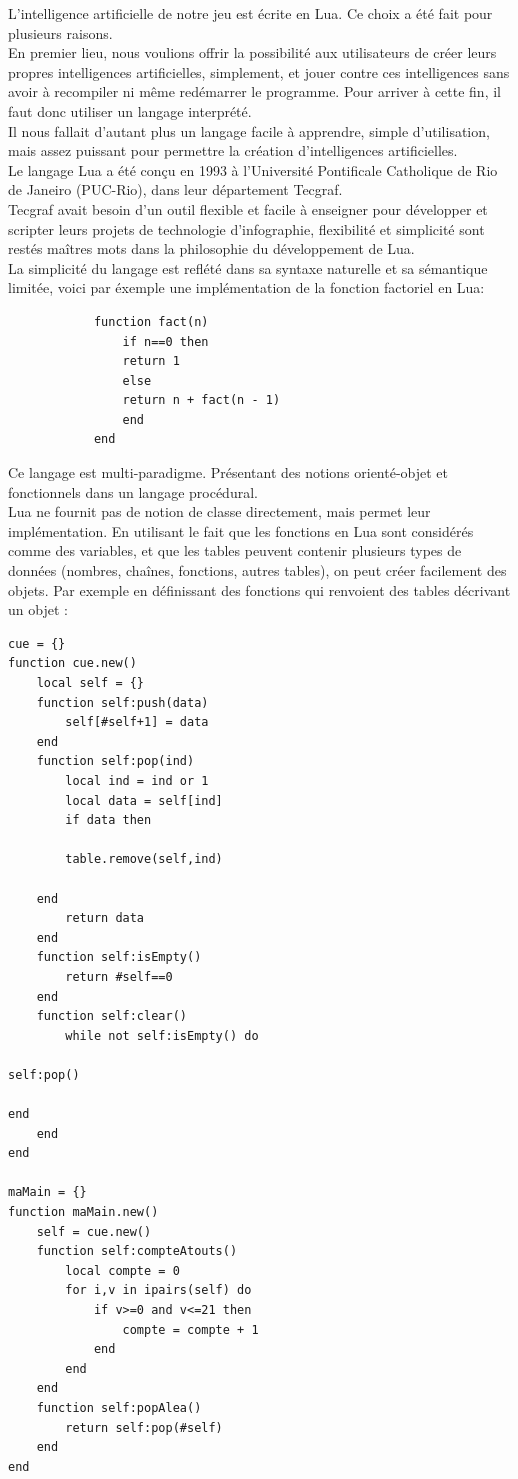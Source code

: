 \documentclass[a4paper]{report}
\begin{document}
		L’intelligence artificielle de notre jeu est écrite en Lua. Ce choix a été fait pour plusieurs raisons.\\
		En premier lieu, nous voulions offrir la possibilité aux utilisateurs de créer leurs propres intelligences artificielles, simplement, et jouer contre ces intelligences sans avoir à 			recompiler ni même redémarrer le programme. Pour arriver à cette fin, il faut donc utiliser un langage interprété.\\
Il nous fallait d’autant plus un langage facile à apprendre, simple d’utilisation, mais assez puissant pour permettre la création d’intelligences artificielles.\\
		Le langage Lua a été conçu en 1993 à l’Université Pontificale Catholique de Rio de Janeiro (PUC-Rio), dans leur département Tecgraf.\\
		Tecgraf avait besoin d’un outil flexible et facile à enseigner pour développer et scripter leurs projets de technologie d’infographie, flexibilité et simplicité sont restés maîtres mots 			dans la philosophie du développement de Lua.\\
		
		La simplicité du langage est reflété dans sa syntaxe naturelle et sa sémantique limitée, voici par éxemple une implémentation de la fonction factoriel en Lua:\\
		\begin{verbatim}
			function fact(n)
			    if n==0 then
				return 1
			    else
				return n + fact(n - 1)
			    end
			end
		\end{verbatim}
		Ce langage est multi-paradigme. Présentant des notions orienté-objet et fonctionnels dans un langage procédural.\\

Lua ne fournit pas de notion de classe directement, mais permet leur implémentation. En utilisant le fait que les fonctions en Lua sont considérés comme des variables, et que les tables peuvent contenir plusieurs types de données (nombres, chaînes, fonctions, autres tables), on peut créer facilement des objets. Par exemple en définissant des fonctions qui renvoient des tables décrivant un objet :\\
		\begin{verbatim}
cue = {}
function cue.new()
    local self = {}
    function self:push(data)
        self[#self+1] = data
    end
    function self:pop(ind)
        local ind = ind or 1
        local data = self[ind]
        if data then

        table.remove(self,ind)

    end
        return data
    end
    function self:isEmpty()
        return #self==0
    end
    function self:clear()
        while not self:isEmpty() do

self:pop()

end
    end
end

maMain = {}
function maMain.new()
    self = cue.new()
    function self:compteAtouts()
        local compte = 0
        for i,v in ipairs(self) do
            if v>=0 and v<=21 then
                compte = compte + 1
            end
        end
    end
    function self:popAlea()
        return self:pop(#self)
    end
end
		\end{verbatim}
\end{document}
